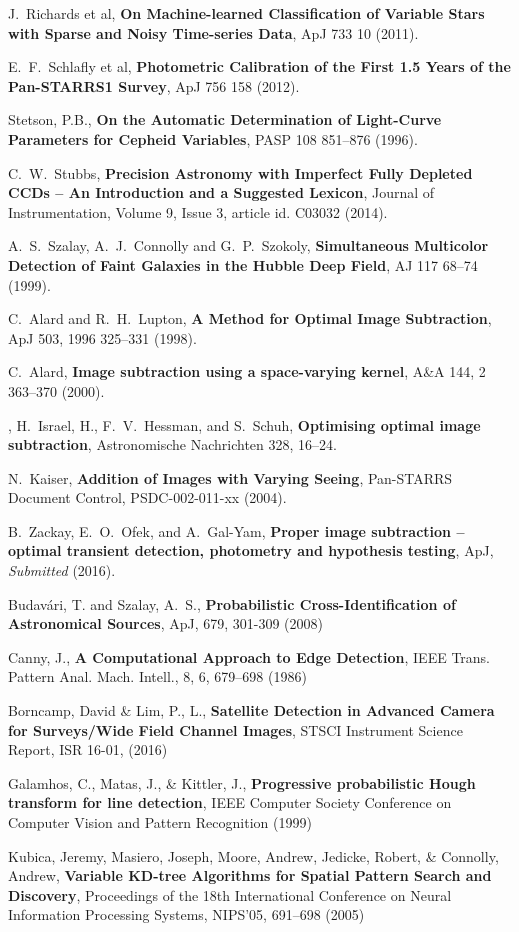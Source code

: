 \documentclass[DM,lsstdraft,SDD]{lsstdoc}
\begin{document}
\begin{thebibliography}{10}
 J.~Richards et al,
  \textbf{On Machine-learned Classification of Variable Stars with Sparse and Noisy Time-series Data},
  ApJ 733 10 (2011).

 E.~F.~Schlafly et al,
  \textbf{Photometric Calibration of the First 1.5 Years of the Pan-STARRS1 Survey},
  ApJ 756 158 (2012).

 Stetson, P.B.,
  \textbf{On the Automatic Determination of Light-Curve Parameters for Cepheid Variables},
  PASP 108 851--876 (1996).

 C.~W.~Stubbs,
  \textbf{Precision Astronomy with Imperfect Fully Depleted CCDs -- An Introduction and a Suggested Lexicon},
  Journal of Instrumentation, Volume 9, Issue 3, article id. C03032 (2014).

 A.~S.~Szalay, A.~J.~Connolly and G.~P.~Szokoly,
  \textbf{Simultaneous Multicolor Detection of Faint Galaxies in the Hubble Deep Field},
  AJ 117 68--74 (1999).

 C.~Alard and R.~H.~Lupton,
  \textbf{A Method for Optimal Image Subtraction},
  ApJ 503, 1996 325--331 (1998).

 C.~Alard,
  \textbf{Image subtraction using a space-varying kernel},
  A\&A 144, 2 363–370 (2000).

, H.~Israel, H., F.~V.~Hessman, and S.~Schuh,
  \textbf{Optimising optimal image subtraction},
  Astronomische Nachrichten 328, 16--24.

 N.~Kaiser,
  \textbf{Addition of Images with Varying Seeing},
  Pan-STARRS Document Control, PSDC-002-011-xx (2004).

 B.~Zackay, E.~O.~Ofek, and A.~Gal-Yam,
  \textbf{Proper image subtraction -- optimal transient detection, photometry and hypothesis testing},
  ApJ, {\em Submitted} (2016).

 Budav{\'a}ri, T. and Szalay, A.~S.,
    \textbf{Probabilistic Cross-Identification of Astronomical
      Sources}, ApJ, 679, 301-309 (2008)

 Canny, J., \textbf{A Computational Approach to Edge
    Detection}, IEEE Trans. Pattern Anal. Mach. Intell., 8, 6,
  679--698 (1986)

 Borncamp, David \& Lim, P., L., 
\textbf{Satellite Detection in Advanced Camera for Surveys/Wide Field Channel
Images}, STSCI Instrument Science Report, ISR 16-01, (2016) 

 Galamhos, C., Matas, J., \& Kittler, J.,
  \textbf{Progressive probabilistic Hough transform for line
    detection}, IEEE Computer Society Conference on Computer Vision
  and Pattern Recognition (1999)

 Kubica, Jeremy, Masiero, Joseph, Moore, Andrew,
    Jedicke, Robert, \& Connolly, Andrew, \textbf{Variable KD-tree
      Algorithms for Spatial Pattern Search and Discovery},
    Proceedings of the 18th International Conference on Neural
    Information Processing Systems, NIPS'05, 691--698 (2005)

\end{thebibliography}
\end{document}
